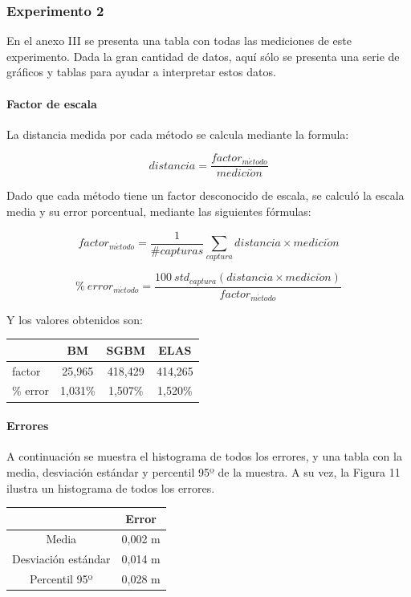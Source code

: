 \documentclass[11pt,a4paper,titlepage]{article}
\newcommand{\Figure}[1]{Figura #1}
\begin{document}
\subsubsection{Experimento 2}

En el anexo III se presenta una tabla con todas las mediciones de este experimento. Dada la gran cantidad de datos, aquí sólo se presenta una serie de gráficos y tablas para ayudar a interpretar estos datos.

\paragraph{Factor de escala}
\hfill \break
La distancia medida por cada método se calcula mediante la formula:

\[
	distancia = \frac{ factor_{m\acute{e}todo} }{ medici\acute{o}n }
\]

Dado que cada método tiene un factor desconocido de escala, se calculó la escala media y su error porcentual, mediante las siguientes fórmulas:

\[
	factor_{m\acute{e}todo} = \frac{1}{\#capturas} \sum_{captura} {distancia \times medici\acute{o}n}
\]

\[
	{\%\ error}_{m\acute{e}todo} = \frac{100 \  std_{captura}(distancia \times medici\acute{o}n)}{factor_{m\acute{e}todo}}
\]

Y los valores obtenidos son:

\begin{tabular}{ | l | c | c | c | }
	\hline  
	& BM & SGBM & ELAS \\
	\hline  
	factor & 25,965 & 418,429 & 414,265 \\
	\hline  
	\% error & 1,031\% & 1,507\% & 1,520\% \\
	\hline  
\end{tabular}

\paragraph{Errores}
\hfill \break
A continuación se muestra el histograma de todos los errores, y una tabla con la media, desviación estándar y percentil 95º de la muestra. A su vez, la \Figure{11} ilustra un histograma de todos los errores.

\begin{tabular}{ | c | c | }
	\hline  
	& Error \\
	\hline  
	Media & 0,002 m \\
	\hline  
	Desviación estándar & 0,014 m \\
	\hline
	Percentil 95º & 0,028 m \\
	\hline    
\end{tabular}
\end{document}
